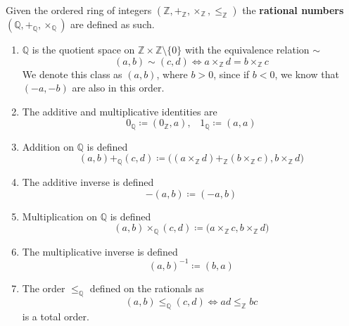   \begin{definition}[Rationals]
    Given the ordered ring of integers $(\mathbb{Z}, +_{\mathbb{Z}}, \times_{\mathbb{Z}}, \leq_{\mathbb{Z}})$ the \textbf{rational numbers} $(\mathbb{Q}, +_{\mathbb{Q}}, \times_{\mathbb{Q}})$ are defined as such. 
    \begin{enumerate}
      \item $\mathbb{Q}$ is the quotient space on $\mathbb{Z} \times \mathbb{Z} \setminus \{0\}$ with the equivalence relation $\sim$ 
      \begin{equation}
        (a, b) \sim (c, d) \iff a \times_{\mathbb{Z}} d = b \times_{\mathbb{Z}} c
      \end{equation} 
      We denote this class as $(a, b)$, where $b > 0$, since if $b < 0$, we know that $(-a, -b)$ are also in this order. 

      \item The additive and multiplicative identities are 
      \begin{equation}
        0_{\mathbb{Q}} \coloneqq (0_{\mathbb{Z}}, a), \;\;\; 1_{\mathbb{Q}} \coloneqq (a, a)
      \end{equation}

      \item Addition on $\mathbb{Q}$ is defined 
      \begin{equation}
        (a, b) +_{\mathbb{Q}} (c, d) \coloneqq \big( (a \times_{\mathbb{Z}} d) +_{\mathbb{Z}} (b \times_{\mathbb{Z}} c), b \times_{\mathbb{Z}} d \big) 
      \end{equation}

      \item The additive inverse is defined 
      \begin{equation}
        -(a, b) \coloneqq (-a, b)
      \end{equation}

      \item Multiplication on $\mathbb{Q}$ is defined 
      \begin{equation}
        (a, b) \times_{\mathbb{Q}} (c, d) \coloneqq \big( a \times_{\mathbb{Z}} c, b \times_{\mathbb{Z}} d \big)
      \end{equation} 

      \item The multiplicative inverse is defined 
      \begin{equation}
        (a, b)^{-1} \coloneqq (b, a)
      \end{equation}

      \item The order $\leq_{\mathbb{Q}}$ defined on the rationals as 
      \begin{equation}
        (a, b) \leq_{\mathbb{Q}} (c, d) \iff ad \leq_{\mathbb{Z}} bc
      \end{equation}
      is a total order. 
    \end{enumerate}
  \end{definition}

